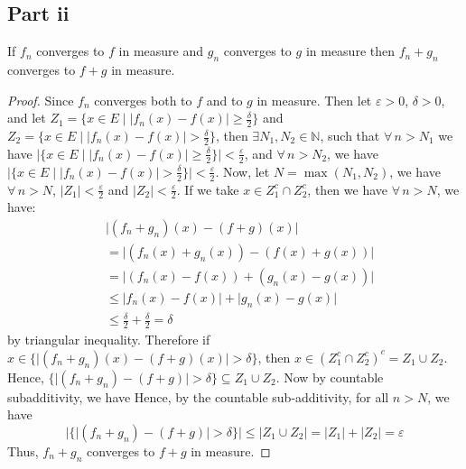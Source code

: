 \subsection{Part ii}

\begin{question}
    If $f_n$ converges to $f$ in measure and $g_n$ converges to $g$ in measure then $f_n+g_n$ converges to $f+g$ in measure.
\end{question}

\begin{answer}
    \begin{proof}
        Since $f_n$ converges both to $f$ and to $g$ in measure. Then let $\varepsilon > 0$, $\delta > 0$, and let $Z_1 = \{x \in E \mid \lvert f_n(x) - f(x) \rvert \geq \tfrac{\delta}{2}\}$ and $Z_2 = \{x \in E \mid \lvert f_{n}(x) - f(x) \rvert > \tfrac{\delta}{2}\}$, then $\exists N_1, N_2 \in \mathbb{N}$, such that $\forall\, n > N_1$ we have $\lvert \{x \in E \mid \lvert f_{n}(x) - f(x) \rvert \geq \tfrac{\delta}{2}\} \rvert < \tfrac{\varepsilon}{2}$, and $\forall\, n > N_2$, we have $\lvert \{x \in E \mid \lvert f_{n}(x) - f(x) \rvert > \tfrac{\delta}{2}\} \rvert < \tfrac{\varepsilon}{2}$. Now, let $N = \max (N_1,N_2)$, we have $\forall \, n > N$, $\lvert Z_1 \rvert < \tfrac{\varepsilon}{2}$ and $\lvert Z_2 \rvert < \tfrac{\varepsilon}{2}$. If we take $x \in Z_1^c \cap Z_2^c$, then we have $\forall \, n > N$, we have:
        \begin{equation}
            \begin{aligned}
                &\lvert (f_n+g_n)(x) - (f+g)(x) \rvert\\
                &= \lvert (f_n(x)+g_n(x)) - (f(x)+g(x)) \rvert\\
                &= \lvert (f_n(x) - f(x)) + (g_n(x) - g(x)) \rvert\\
                &\leq \lvert f_n(x) - f(x) \rvert + \lvert g_n(x) - g(x) \rvert\\
                &\leq  \tfrac{\delta}{2} + \tfrac{\delta}{2} = \delta
            \end{aligned}
        \end{equation}
        by triangular inequality. Therefore if $x \in \{\lvert (f_n+g_n)(x) - (f+g)(x) \rvert > \delta\}$, then $x \in (Z_1^c \cap Z_2^c)^c = Z_1 \cup Z_2$. Hence, $\{\lvert (f_n+g_n) - (f+g) \rvert > \delta\} \subseteq Z_1 \cup Z_2$. Now by countable subadditivity, we have
        Hence, by the countable sub-additivity, for all $n > N$, we have
        \begin{equation}
            \lvert \{\lvert (f_n+g_n) - (f+g) \rvert > \delta\} \rvert \leq \lvert Z_1 \cup Z_2 \rvert = \lvert Z_1 \rvert + \lvert Z_2 \rvert = \varepsilon
        \end{equation}
        Thus, $f_n+g_n$ converges to $f+g$ in measure.
    \end{proof}
\end{answer}

